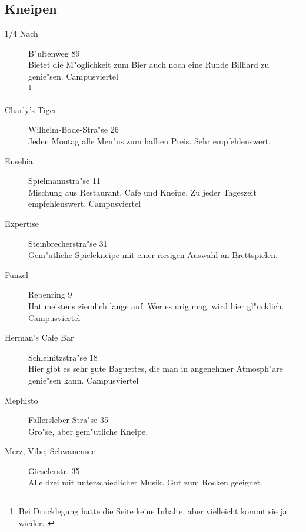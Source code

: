 \subsection{Kneipen}

\begin{description}

\item[1/4 Nach] \hfill B"ultenweg 89\\
Bietet die M"oglichkeit zum Bier auch noch eine Runde Billiard zu genie"sen.
Campusviertel\\
\footnote{Bei Drucklegung hatte die Seite keine Inhalte, aber vielleicht kommt sie ja wieder\ldots}


\item[Charly's Tiger] \hfill Wilhelm-Bode-Stra"se 26\\
Jeden Montag alle Men"us zum halben Preis. Sehr empfehlenswert.


\item[Eusebia] \hfill Spielmannstra"se 11\\
Mischung aus Restaurant, Cafe und Kneipe. Zu jeder Tageszeit empfehlenswert.
Campusviertel

\item[Expertise] \hfill Steinbrecherstra"se 31\\
Gem"utliche Spielekneipe mit einer riesigen Auswahl an Brettspielen.

\item[Funzel] \hfill Rebenring 9\\
Hat meistens ziemlich lange auf. Wer es urig mag, wird hier gl"ucklich.
Campusviertel

\item[Herman's Cafe Bar] \hfill Schleinitzstra"se 18\\
Hier gibt es sehr gute Baguettes, die man in angenehmer Atmosph"are genie"sen kann.
Campusviertel\\

\item[Mephisto] \hfill Fallersleber Stra"se 35\\
Gro"se, aber gem"utliche Kneipe.

\item[Merz, Vibe, Schwanensee] \hfill Gieselerstr. 35\\
Alle drei mit unterschiedlicher Musik. Gut zum Rocken geeignet.\\


\end{description}
